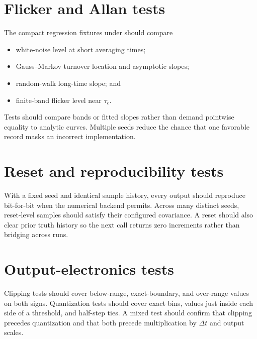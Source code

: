 \documentclass[11pt,oneside,headings=big]{scrreprt}
\begin{document}
    \section{Flicker and Allan tests}
    The compact regression fixtures under  should
    compare
    \begin{itemize}
        \item white-noise level at short averaging times;
        \item Gauss--Markov turnover location and asymptotic slopes;
        \item random-walk long-time slope; and
        \item finite-band flicker level near \(\tau_c\).
    \end{itemize}
    Tests should compare bands or fitted slopes rather than demand pointwise equality
    to analytic curves. Multiple seeds reduce the chance that one favorable record
    masks an incorrect implementation.


    \section{Reset and reproducibility tests}
    With a fixed seed and identical sample history, every output should reproduce
    bit-for-bit when the numerical backend permits. Across many distinct seeds,
    reset-level samples should satisfy their configured covariance. A reset should
    also clear prior truth history so the next call returns zero increments rather
    than bridging across runs.


    \section{Output-electronics tests}
    Clipping tests should cover below-range, exact-boundary, and over-range values on
    both signs. Quantization tests should cover exact bins, values just inside each
    side of a threshold, and half-step ties. A mixed test should confirm that
    clipping precedes quantization and that both precede multiplication by
    \(\Delta t\) and output scales.
\end{document}
